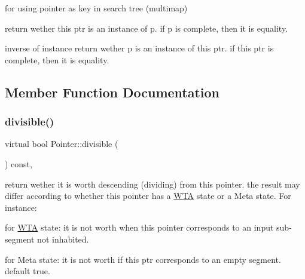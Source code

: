\begin{DoxyCode}{0}
\end{DoxyCode}
 for using pointer as key in search tree (multimap)


\begin{DoxyCode}{0}
\end{DoxyCode}
 return wether this ptr is an instance of p. if p is complete, then it is equality.


\begin{DoxyCode}{0}
\end{DoxyCode}
 inverse of instance return wether p is an instance of this ptr. if this ptr is complete, then it is equality. 

\subsection{Member Function Documentation}
\mbox{\label{classPointer_a51529c3e4714cafc28ba07da36078618}} 
\subsubsection{\texorpdfstring{divisible()}{divisible()}}
{\footnotesize\ttfamily virtual bool Pointer\+::divisible (\begin{DoxyParamCaption}{ }\end{DoxyParamCaption}) const\hspace{0.3cm}{\ttfamily [inline]}, {\ttfamily [virtual]}}



return wether it is worth descending (dividing) from this pointer. the result may differ according to whether this pointer has a \mbox{\hyperlink{classWTA}{W\+TA}} state or a Meta state. For instance\+: 


\begin{DoxyItemize}
\item for \mbox{\hyperlink{classWTA}{W\+TA}} state\+: it is not worth when this pointer corresponds to an input sub-\/segment not inhabited.
\item for Meta state\+: it is not worth if this ptr corresponds to an empty segment. default true. 
\end{DoxyItemize}

